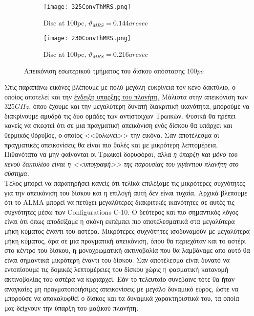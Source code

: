 \begin{figure}[h]
\centering
 \begin{subfigure}{0.48\textwidth}
  \centering
  \texttt{[image: 325ConvThMRS.png]}
  \caption{{\en Disc at 100pc}, $\vartheta_{MRS}= 0.144 arcsec$}\label{fig:325ConvThMRS}
 \end{subfigure}\hfill
 \begin{subfigure}{0.48\textwidth}
  \centering
  \texttt{[image: 230ConvThMRS.png]}
  \caption{{\en Disc at 100pc}, $\vartheta_{MRS}= 0.216 arcsec$}\label{fig:230ConvThMRS}
 \end{subfigure}\hfill
 \caption{Απεικόνιση εσωτερικού τμήματος του δίσκου απόστασης $100pc$}
\end{figure} 

Στις παραπάνω εικόνες βλέπουμε με πολύ μεγάλη ευκρίνεια τον κενό δακτύλιο, ο οποίος αποτελεί και την \underline{ένδειξη υπαρξης του πλανήτη.} Μάλιστα στην απεικόνιση των $325GHz$, όπου έχουμε και την μεγαλύτερη δυνατή διακριτική ικανότητα, μπορούμε να διακρίνουμε αμυδρά τις δύο ομάδες των αντίστοιχων Τρωικών. Φυσικά θα πρέπει κανείς να σκεφτεί ότι σε μια πραγματική απεικόνιση ενός δίσκου θα υπάρχει και θερμικός θόρυβος, ο οποίος <<θολωνει>> την εικόνα. Σαν αποτέλεσμα οι πραγματικές απεικονίσεις θα είναι πιο θολές και με μικρότερη λεπτομέρεια. Πιθανότατα να μην φαίνονται οι Τρωικοί δορυφόροι, αλλα {\it η ύπαρξη και μόνο του κενού δακτυλίου είναι η <<υπογραφή>> της παρουσίας του γιγάντιου πλανήτη στο σύστημα.}\\

Τέλος μπορεί να παρατηρήσει κανείς ότι τελίκά επιλέξαμε τις μικρότερες συχνότητες για την απεικόνιση του δίσκου και η επιλογή αυτή δεν είναι τυχαία. Αρχικά βλεπουμε ότι το {\en ALMA} μπορεί να πετύχει μεγαλύτερες διακριτικές ικανότητες σε αυτές τις συχνότητες μέσω των {\en Configurations C-10}. Ο δεύτερος και πιο σημαντικός λόγος είναι ότι όπως αποδείξαμε η σκόνη εκπέμπει πιο αποτελεσματικά στα μεγαλύτερα μήκη κύματος έναντι του αστέρα. Μικρότερες συχνότητες ισοδυναμούν με μεγαλύτερα μήκη κύματος, άρα σε μια πραγματική απεικόνιση, όπου θα περιεχόταν και το αστέρι στο κέντρο του δίσκου, η μονοχρωματική ακτινοβολία που θα λαμβάναμε απο αυτό θα είναι σημαντικά μικρότερη έναντι του δίσκου. Σαν αποτέλεσμα είναι δυνατό να εντοπίσουμε τις δομικές λεπτομέρειες του δίσκου χώρις η φασματική κατανομή ακτινοβολίας του αστέρα να κυριαρχεί. Εάν το τελευταίο συνέβαινε τότε θα ήταν αναγκαίες μη πραγματοποιήσιμες απεικονίσεις με μεγάλο δυναμικό εύρος, ώστε να μπορούσε να αποκαλυφθεί ο δίσκος και τα δυναμικά χαρακτηριστικά του, τα οποία μας δείχνουν την ύπαρξη του μαζικού πλανήτη.